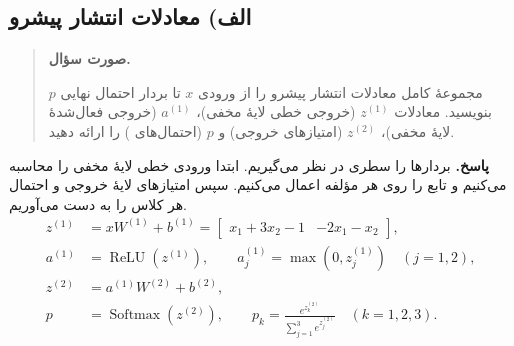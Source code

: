 \documentclass{article}
\numberwithin{equation}{section}
\numberwithin{table}{section}
\DeclareMathOperator{\ReLU}{ReLU}
\DeclareMathOperator{\softmax}{Softmax}
\newenvironment{questionprompt}{%
    \begin{quote}\noindent\textbf{صورت سؤال.}\enspace\ignorespaces
}{%
    \end{quote}\noindent\textbf{پاسخ.}\enspace\ignorespacesafterend
}
\begin{document}
\subsection*{الف) معادلات انتشار پیشرو}
\begin{questionprompt}
    مجموعهٔ کامل معادلات انتشار پیشرو را از ورودی \(x\) تا بردار احتمال نهایی \(p\) بنویسید. معادلات \(z^{(1)}\) (خروجی خطی لایهٔ مخفی)، \(a^{(1)}\) (خروجی فعال‌شدهٔ لایهٔ مخفی)، \(z^{(2)}\) (امتیازهای خروجی) و \(p\) (احتمال‌های ) را ارائه دهید.
\end{questionprompt}
بردارها را سطری در نظر می‌گیریم. ابتدا ورودی خطی لایهٔ مخفی را محاسبه می‌کنیم و تابع  را روی هر مؤلفه اعمال می‌کنیم. سپس امتیازهای لایهٔ خروجی و احتمال هر کلاس را به دست می‌آوریم.
\begin{align*}
    z^{(1)} &= xW^{(1)}+b^{(1)}
              = \begin{bmatrix}x_1+3x_2-1 & -2x_1-x_2\end{bmatrix},\\
    a^{(1)} &= \ReLU(z^{(1)}), \qquad
               a_j^{(1)}=\max(0,z_j^{(1)}) \quad (j=1,2),\\
    z^{(2)} &= a^{(1)}W^{(2)}+b^{(2)},\\
    p &= \softmax(z^{(2)}), \qquad
         p_k=\frac{e^{z_k^{(2)}}}{\sum_{j=1}^{3}e^{z_j^{(2)}}}
         \quad (k=1,2,3).
\end{align*}
\end{document}
